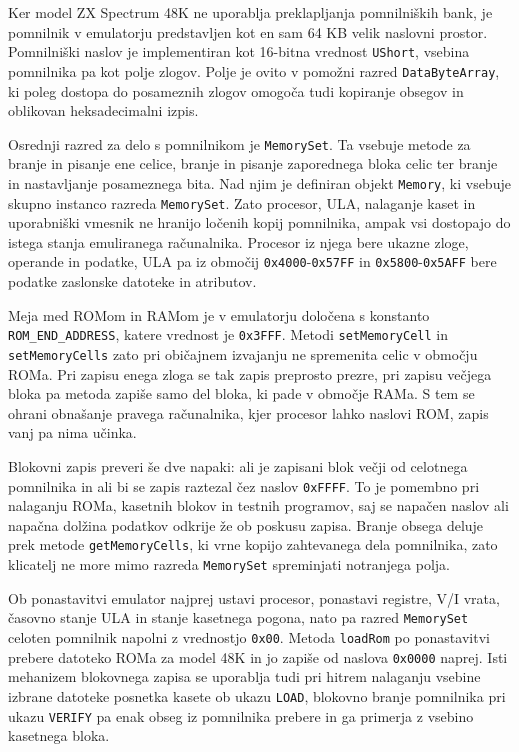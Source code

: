 \documentclass[a4paper, 12pt, openright]{book}
\begin{document}
    Ker model ZX Spectrum 48K ne uporablja preklapljanja pomnilniških bank, je pomnilnik
    v emulatorju predstavljen kot en sam 64 KB velik naslovni prostor.
    Pomnilniški naslov je implementiran kot 16-bitna vrednost \texttt{UShort},
    vsebina pomnilnika pa kot polje zlogov. Polje je ovito v pomožni razred \texttt{DataByteArray},
    ki poleg dostopa do posameznih zlogov omogoča tudi kopiranje obsegov in oblikovan
    heksadecimalni izpis.

    Osrednji razred za delo s pomnilnikom je \texttt{MemorySet}. Ta vsebuje metode
    za branje in pisanje ene celice, branje in pisanje zaporednega bloka celic
    ter branje in nastavljanje posameznega bita. Nad njim je definiran objekt \texttt{Memory},
    ki vsebuje skupno instanco razreda \texttt{MemorySet}. Zato procesor, ULA, nalaganje
    kaset in uporabniški vmesnik ne hranijo ločenih kopij pomnilnika, ampak vsi
    dostopajo do istega stanja emuliranega računalnika. Procesor iz njega bere ukazne
    zloge, operande in podatke, ULA pa iz območij \texttt{0x4000}-\texttt{0x57FF}
    in \texttt{0x5800}-\texttt{0x5AFF} bere podatke zaslonske datoteke in atributov.

    Meja med ROMom in RAMom je v emulatorju določena s konstanto \texttt{ROM\_END\_ADDRESS},
    katere vrednost je \texttt{0x3FFF}. Metodi \texttt{setMemoryCell} in\\ \texttt{setMemoryCells}
    zato pri običajnem izvajanju ne spremenita celic v območju ROMa. Pri zapisu enega
    zloga se tak zapis preprosto prezre, pri zapisu večjega bloka pa metoda
    zapiše samo del bloka, ki pade v območje RAMa. S tem se ohrani obnašanje
    pravega računalnika, kjer procesor lahko naslovi ROM, zapis vanj pa nima
    učinka.

    Blokovni zapis preveri še dve napaki: ali je zapisani blok večji od celotnega
    pomnilnika in ali bi se zapis raztezal čez naslov \texttt{0xFFFF}. To je pomembno
    pri nalaganju ROMa, kasetnih blokov in testnih programov, saj se napačen naslov
    ali napačna dolžina podatkov odkrije že ob poskusu zapisa. Branje obsega
    deluje prek metode \texttt{getMemoryCells}, ki vrne kopijo zahtevanega dela
    pomnilnika, zato klicatelj ne more mimo razreda \texttt{MemorySet}
    spreminjati notranjega polja.

    Ob ponastavitvi emulator najprej ustavi procesor, ponastavi registre, V/I
    vrata, časovno stanje ULA in stanje kasetnega pogona, nato pa razred \texttt{MemorySet}
    celoten pomnilnik napolni z vrednostjo \texttt{0x00}. Metoda \texttt{loadRom}
    po ponastavitvi prebere datoteko ROMa za model 48K in jo zapiše od naslova
    \texttt{0x0000} naprej. Isti mehanizem blokovnega zapisa se uporablja tudi
    pri hitrem nalaganju vsebine izbrane datoteke posnetka kasete ob ukazu
    \texttt{LOAD}, blokovno branje pomnilnika pri ukazu \texttt{VERIFY} pa enak obseg
    iz pomnilnika prebere in ga primerja z vsebino kasetnega bloka.
\end{document}
